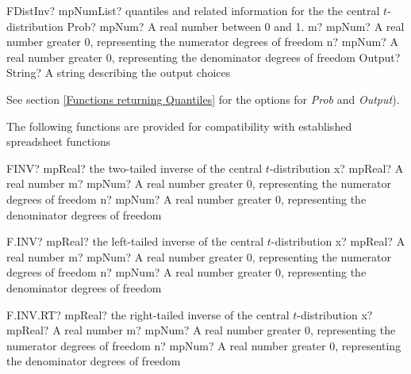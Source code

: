 \begin{mpFunctionsExtract}
	\mpFunctionThreeNotImplemented
	{FDistInv? mpNumList? quantiles and related information for the the central $t$-distribution}
	{Prob? mpNum? A real number between 0 and 1.}
	{m? mpNum? A real number greater 0, representing the numerator  degrees of freedom}
	{n? mpNum? A real number greater 0, representing the denominator degrees of freedom}
	{Output? String? A string describing the output choices}
\end{mpFunctionsExtract}

See section \ref{Functions returning Quantiles} for the options for  {\itshape\sffamily Prob} and {\itshape\sffamily Output}). 

\vspace{0.3cm}

The following functions are provided for compatibility with established spreadsheet functions

\vspace{0.3cm}
\begin{mpFunctionsExtract}
	\mpWorksheetFunctionThreeNotImplemented
	{FINV? mpReal? the two-tailed inverse of the central $t$-distribution}
	{x? mpReal? A real number}
	{m? mpNum? A real number greater 0, representing the numerator  degrees of freedom}
	{n? mpNum? A real number greater 0, representing the denominator degrees of freedom}
\end{mpFunctionsExtract}

\vspace{0.6cm}
\begin{mpFunctionsExtract}
	\mpWorksheetFunctionThreeNotImplemented
	{F.INV? mpReal? the left-tailed inverse of the central $t$-distribution}
	{x? mpReal? A real number}
	{m? mpNum? A real number greater 0, representing the numerator  degrees of freedom}
	{n? mpNum? A real number greater 0, representing the denominator degrees of freedom}
\end{mpFunctionsExtract}

\vspace{0.6cm}
\begin{mpFunctionsExtract}
	\mpWorksheetFunctionThreeNotImplemented
	{F.INV.RT? mpReal? the right-tailed inverse of the central $t$-distribution}
	{x? mpReal? A real number}
	{m? mpNum? A real number greater 0, representing the numerator  degrees of freedom}
	{n? mpNum? A real number greater 0, representing the denominator degrees of freedom}
\end{mpFunctionsExtract}


